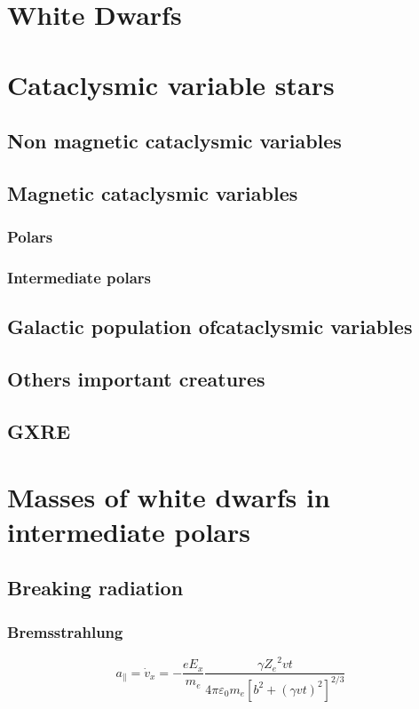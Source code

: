 \documentclass[oneside,a4paper,11pt]{report}
\begin{document}
\chapter{White Dwarfs}


\chapter{Cataclysmic variable stars}
\section{Non magnetic cataclysmic variables} 
\section{Magnetic cataclysmic variables}
\subsection{Polars}
\subsection{Intermediate polars}
\section{Galactic population ofcataclysmic variables }
\section{Others important creatures}
\section{GXRE}



\chapter{Masses of white dwarfs in intermediate polars}
\section{Breaking radiation}
\subsection{Bremsstrahlung}
\begin{equation}
 a_{\parallel} = \dot{v}_x = -\frac{eE_x}{m_e}\frac{\gamma {Z_e}^2 vt}{4\pi \varepsilon_0 m_e \left [ b^2 + \left ( \gamma vt \right )^2  \right ]^{2/3}} 
\end{equation}
\end{document}
